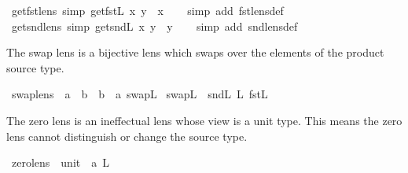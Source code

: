\begin{isabellebody}
\isanewline
{}\isamarkupfalse%
\ get{\isacharunderscore}fst{\isacharunderscore}lens\ {\isacharbrackleft}simp{\isacharbrackright}{\isacharcolon}\ {\isachardoublequoteopen}get\isactrlbsub fst\isactrlsub L\isactrlesub \ {\isacharparenleft}x{\isacharcomma}\ y{\isacharparenright}\ {\isacharequal}\ x{\isachardoublequoteclose}\isanewline
%
\isadelimproof
\ \ %
\endisadelimproof
%
\isatagproof
{}\isamarkupfalse%
\ {\isacharparenleft}simp\ add{\isacharcolon}\ fst{\isacharunderscore}lens{\isacharunderscore}def{\isacharparenright}%
\endisatagproof
{\isafoldproof}%
%
\isadelimproof
\isanewline
%
\endisadelimproof
\isanewline
{}\isamarkupfalse%
\ get{\isacharunderscore}snd{\isacharunderscore}lens\ {\isacharbrackleft}simp{\isacharbrackright}{\isacharcolon}\ {\isachardoublequoteopen}get\isactrlbsub snd\isactrlsub L\isactrlesub \ {\isacharparenleft}x{\isacharcomma}\ y{\isacharparenright}\ {\isacharequal}\ y{\isachardoublequoteclose}\isanewline
%
\isadelimproof
\ \ %
\endisadelimproof
%
\isatagproof
{}\isamarkupfalse%
\ {\isacharparenleft}simp\ add{\isacharcolon}\ snd{\isacharunderscore}lens{\isacharunderscore}def{\isacharparenright}%
\endisatagproof
{\isafoldproof}%
%
\isadelimproof
%
\endisadelimproof
%
\begin{isamarkuptext}%
The swap lens is a bijective lens which swaps over the elements of the product source type.%
\end{isamarkuptext}\isamarkuptrue%
\isamarkupfalse%
\ swap{\isacharunderscore}lens\ {\isacharcolon}{\isacharcolon}\ {\isachardoublequoteopen}{\isacharprime}a\ {\isasymtimes}\ {\isacharprime}b\ {\isasymLongrightarrow}\ {\isacharprime}b\ {\isasymtimes}\ {\isacharprime}a{\isachardoublequoteclose}\ {\isacharparenleft}{\isachardoublequoteopen}swap\isactrlsub L{\isachardoublequoteclose}{\isacharparenright}\ \isanewline
{\isachardoublequoteopen}swap\isactrlsub L\ {\isasymequiv}\ snd\isactrlsub L\ {\isacharplus}\isactrlsub L\ fst\isactrlsub L{\isachardoublequoteclose}%
\begin{isamarkuptext}%
The zero lens is an ineffectual lens whose view is a unit type. This means the zero lens
  cannot distinguish or change the source type.%
\end{isamarkuptext}\isamarkuptrue%
\isamarkupfalse%
\ zero{\isacharunderscore}lens\ {\isacharcolon}{\isacharcolon}\ {\isachardoublequoteopen}unit\ {\isasymLongrightarrow}\ {\isacharprime}a{\isachardoublequoteclose}\ {\isacharparenleft}{\isachardoublequoteopen}{}\isactrlsub L{\isachardoublequoteclose}{\isacharparenright}\ \isanewline

\end{isabellebody}
